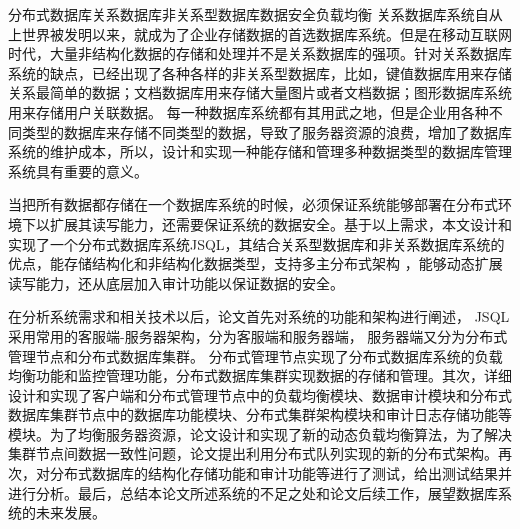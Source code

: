 
\begin{Cabstract}{分布式数据库}{关系数据库}{非关系型数据库}{数据安全}{负载均衡}
关系数据库系统自从上世界被发明以来，就成为了企业存储数据的首选数据库系统。但是在移动互联网时代，大量非结构化数据的存储和处理并不是关系数据库的强项。针对关系数据库系统的缺点，已经出现了各种各样的非关系型数据库，比如，键值数据库用来存储关系最简单的数据；文档数据库用来存储大量图片或者文档数据；图形数据库系统用来存储用户关联数据。
每一种数据库系统都有其用武之地，但是企业用各种不同类型的数据库来存储不同类型的数据，导致了服务器资源的浪费，增加了数据库系统的维护成本，所以，设计和实现一种能存储和管理多种数据类型的数据库管理系统具有重要的意义。

当把所有数据都存储在一个数据库系统的时候，必须保证系统能够部署在分布式环境下以扩展其读写能力，还需要保证系统的数据安全。基于以上需求，本文设计和实现了一个分布式数据库系统JSQL，其结合关系型数据库和非关系数据库系统的优点，能存储结构化和非结构化数据类型，支持多主分布式架构 ，能够动态扩展读写能力，还从底层加入审计功能以保证数据的安全。

在分析系统需求和相关技术以后，论文首先对系统的功能和架构进行阐述，
JSQL采用常用的客服端-服务器架构，分为客服端和服务器端，
服务器端又分为分布式管理节点和分布式数据库集群。
分布式管理节点实现了分布式数据库系统的负载均衡功能和监控管理功能，分布式数据库集群实现数据的存储和管理。其次，详细设计和实现了客户端和分布式管理节点中的负载均衡模块、数据审计模块和分布式数据库集群节点中的数据库功能模块、分布式集群架构模块和审计日志存储功能等模块。为了均衡服务器资源，论文设计和实现了新的动态负载均衡算法，为了解决集群节点间数据一致性问题，论文提出利用分布式队列实现的新的分布式架构。再次，对分布式数据库的结构化存储功能和审计功能等进行了测试，给出测试结果并进行分析。最后，总结本论文所述系统的不足之处和论文后续工作，展望数据库系统的未来发展。
\end{Cabstract}